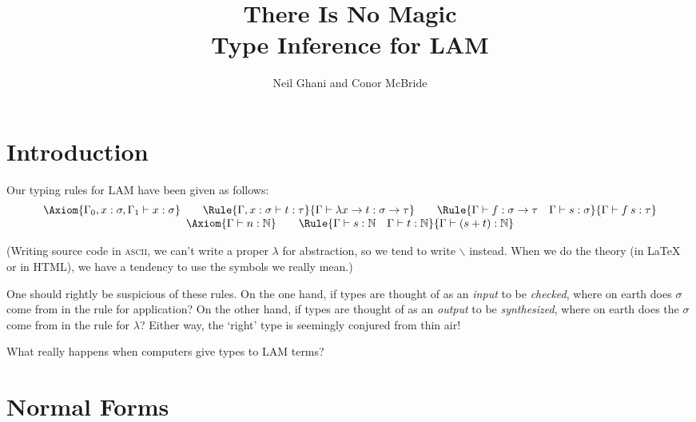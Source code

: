 \documentclass{article}
\begin{document}
\title{There Is No Magic \\
  Type Inference for LAM}
\author{Neil Ghani and Conor McBride}
\maketitle

\newcommand{\Nat}{\mathbb{N}}
\newcommand{\fbx}[1]{\framebox{\ensuremath{#1}}}
\newcommand{\NT}[1]{\langle #1 \rangle}
  
\section{Introduction}

Our typing rules for LAM have been given as follows:
\[\begin{array}{c}
    \Axiom{\Gamma_0,x:\sigma,\Gamma_1 \vdash x:\sigma}\qquad
    \Rule{\Gamma,x:\sigma\vdash t:\tau}
    {\Gamma\vdash \lambda x \to t : \sigma \to \tau}\qquad
    \Rule{\Gamma\vdash f:\sigma\to\tau\quad \Gamma\vdash s:\sigma}
    {\Gamma\vdash f\:s : \tau}
    \\
    \Axiom{\Gamma\vdash n:\Nat} \qquad
    \Rule{\Gamma\vdash s:\Nat\quad\Gamma\vdash t:\Nat}
      {\Gamma\vdash (s+t) : \Nat}
\end{array}\]

(Writing source code in \textsc{ascii}, we can't write a proper $\lambda$ for abstraction,
so we tend to write $\backslash$ instead. When we do the theory (in
\LaTeX{} or in HTML), we have a tendency to use the symbols we really mean.)

One should rightly be suspicious of these rules. On the one hand,
if types are thought of as an \emph{input} to be \emph{checked},
where on earth does $\sigma$ come from in the rule for application?
On the other hand, if types are thought of as an \emph{output} to be
\emph{synthesized}, where on earth does the $\sigma$ come from in
the rule for $\lambda$? Either way, the `right' type is seemingly conjured
from thin air!

What really happens when computers give types to LAM terms?


\section{Normal Forms}
\end{document}
